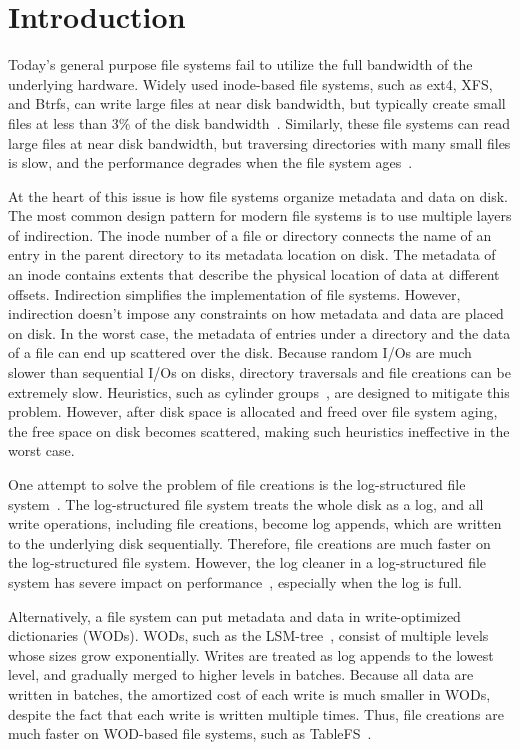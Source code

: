 \chapter{Introduction}
\label{chap:intro}

Today's general purpose file systems fail to utilize the full bandwidth of the
underlying hardware.
Widely used inode-based file systems, such as ext4, XFS, and Btrfs, can write
large files at near disk bandwidth,
but typically create small files at less than 3\% of the disk bandwidth~\citep{betrfs2}.
Similarly, these file systems can read large files at near disk bandwidth,
but traversing directories with many small files is slow, and the performance
degrades when the file system ages~\citep{betrfs3}.

At the heart of this issue is how file systems organize metadata and data
on disk.
The most common design pattern for modern file systems is to use multiple layers
of indirection.
The inode number of a file or directory connects the name of an entry in the
parent directory to its metadata location on disk.
The metadata of an inode contains extents that describe the physical location
of data at different offsets.
Indirection simplifies the implementation of file systems.
However, indirection doesn't impose any constraints on how metadata and
data are placed on disk.
In the worst case, the metadata of entries under a directory and the data of
a file can end up scattered over the disk.
Because random I/Os are much slower than sequential I/Os on disks,
directory traversals and file creations can be extremely slow.
Heuristics, such as cylinder groups~\citep{ffs1}, are designed to mitigate this
problem.
However, after disk space is allocated and freed over file system aging,
the free space on disk becomes scattered, making such heuristics
ineffective in the worst case.

One attempt to solve the problem of file creations is the log-structured file
system~\citep{lfs}.
The log-structured file system treats the whole disk as a log,
and all write operations, including file creations, become log appends,
which are written to the underlying disk sequentially.
Therefore, file creations are much faster on the log-structured file system.
However, the log cleaner in a log-structured file system has severe impact on
performance~\citep{lfsbsd}, especially when the log is full.

Alternatively, a file system can put metadata and data in
write-optimized dictionaries (WODs).
WODs, such as the LSM-tree~\cite{lsm},
consist of multiple levels whose sizes grow exponentially.
Writes are treated as log appends to the lowest level, and gradually merged to
higher levels in batches.
Because all data are written in batches, the amortized cost of each write is
much smaller in WODs,
despite the fact that each write is written multiple times.
Thus, file creations are much faster on WOD-based file systems, such as
TableFS~\citep{tablefs}.

